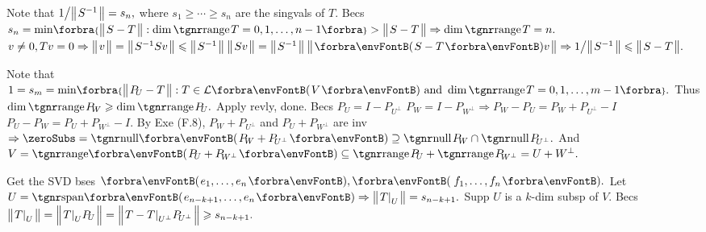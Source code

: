 Note that $1\big/\big\Vert\hspace{1pt}{}S^{-1}{}\hspace{1pt}\big\Vert=s_n,$ where $s_1\geqslant\cdots\geqslant s_n$ are the singvals of $T.$\parSol{}
Becs $s_n=\min\!\Bra{\Dvert{S-T}:\dim\range T=0,1,\dots,n-1}>\Dvert{S-T}\Rightarrow\dim\range T=n.$\PfEnd\vspace{2pt}\parSol{}
\Or $v\neq0,Tv=0\Rightarrow\Dvert{v}=\Dvert{S^{-1}Sv}\leqslant\Dvert{S^{-1}}\:\Dvert{Sv}=\Dvert{S^{-1}}\:\Dvert{\Par{S-T}v}\Rightarrow1\big/\Dvert{S^{-1}}\leqslant\Dvert{S-T}.$\PfEnd
\SepLine

Note that $1=s_m=\min\!\Bra{\Dvert{P_{\!U}-T}:T\in\Lm{V}\text{ and }\dim\range T=0,1,\dots,m-1}.$\parSol{}
Thus $\dim\range P_{\!W}\geqslant\dim\range P_{\!U}.$ \;Apply revly, done.\PfEnd\vspace{2pt}\parSol{}
\Or Becs $P_{\!U}=I-P_{\!U^\perp}$ \OR $P_{\!W}=I-P_{\!W^\perp}\Rightarrow P_{\!W}-P_{\!U}=P_{\!W}+P_{\!U^\perp}-I$\, \OR \,$P_{\!U}-P_{\!W}=P_{\!U}+P_{\!W^\perp}-I.$\parSol{}
By Exe (F.8), $P_{\!W}+P_{\!U^\perp}$ and $P_{\!U}+P_{\!W^\perp}$ are inv $\Rightarrow\zeroSubs=\Null\Par{P_{\!W}+P_{\!U^\perp}}\supseteq\null P_{\!W}\cap\null P_{\!U^\perp}.$\parSol{}
And $V=\Range\Par{P_{\!U}+P_{\!W^\perp}}\subseteq\range P_{\!U}+\range P_{\!W^\perp}=U+W^\perp.$\PfEnd
\SepLine

Get the SVD bses $\Par{e_1,\dots,e_n},\Par{\,f_1,\dots,f_n}.$ Let $U=\Span{e_{n-k+1},\dots,e_n}\Rightarrow\Dvert{T\mmid_U}=s_{n-k+1}.$\vspace{1pt}\parSol{}
Supp $U$ is a $k$\hspace{1pt}-\hspace{1pt}dim subsp of $V.$ Becs $\big\Vert\hspace{1pt}{}T\text{\normalsize|}_U{}\hspace{1pt}\big\Vert=\Big\Vert\hspace{1pt}{}T\text{\normalsize|}_UP_{\!U}{}\hspace{1pt}\Big\Vert=\Big\Vert\hspace{1pt}{}T-T\text{\normalsize|}_{U^\perp}P_{\!U^\perp}{}\hspace{1pt}\Big\Vert\geqslant s_{n-k+1}.$\PfEnd
\SepLine

